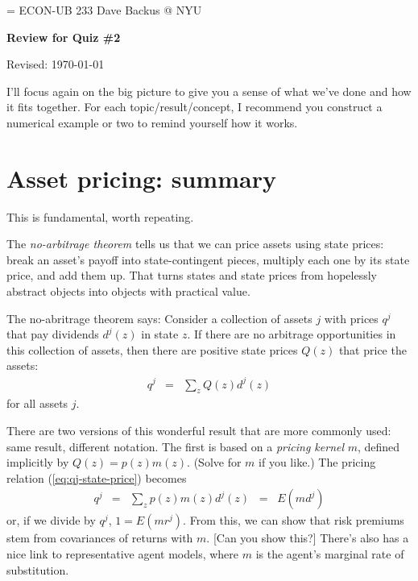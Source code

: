 \documentclass[11pt]{article}
\begin{document}
\parskip=\bigskipamount
\parindent=0.0in
\thispagestyle{empty}
{\large ECON-UB 233 \hfill Dave Backus @ NYU}

\bigskip\bigskip
\centerline{\Large \bf Review for Quiz \#2}
\centerline{Revised: \today}

\bigskip
I'll focus again on the big picture to give you a sense of
what we've done and how it fits together.
For each topic/result/concept, I recommend you construct a numerical example or two to
remind yourself how it works.


\section{Asset pricing:  summary}

This is fundamental, worth repeating.

The {\it no-arbitrage theorem\/} tells us that we can price
assets using state prices:
break an asset's payoff into state-contingent pieces,
multiply each one by its state price, and add them up.
That turns states and state prices from hopelessly abstract objects
into objects with practical value.

The no-abritrage theorem says:
Consider a collection of assets $j$ with prices $q^j$ that pay dividends $d^j(z)$
in state $z$.
If there are no arbitrage opportunities in this collection of assets,
then there are positive state prices $Q(z)$ that price the assets:
\begin{eqnarray}
    q^j &=& \sum_z Q(z) d^j(z)
    \label{eq:qj-state-price}
\end{eqnarray}
for all assets $j$.

There are two versions of this wonderful result that are more commonly used:
same result, different notation.
The first is based on a {\it pricing kernel\/} $m$,
defined implicitly by $ Q(z) = p(z) m(z)$.
(Solve for $m$ if you like.)
The pricing relation (\ref{eq:qj-state-price}) becomes
\begin{eqnarray}
    q^j &=& \sum_z p(z) m(z) d^j(z) \;\;=\;\; E (m d^j)
    \label{eq:q=Emd}
\end{eqnarray}
or, if we divide by $q^j$, $ 1 = E(mr^j) $.
From this, we can show that risk premiums stem from covariances of returns with $m$.
[Can you show this?]
There's also has a nice link to representative agent models,
where $m$ is the agent's marginal rate of substitution.
\end{document}
